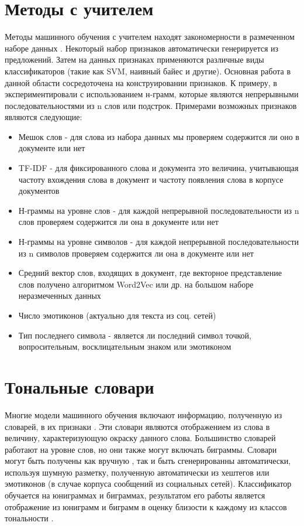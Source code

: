 \section{Методы с учителем}
Методы машинного обучения с учителем находят закономерности в размеченном наборе данных \cite{Pang25}. Некоторый набор признаков автоматически генерируется из предложений. Затем на данных признаках применяются различные виды классификаторов (такие как SVM, наивный байес и другие). Основная работа в данной области сосредоточена на конструировании признаков. К примеру, в \cite{Pang24} экспериментировали с использованием н-грамм, которые являются непрерывными последовательностями из n слов или подстрок. Примерами возможных признаков являются следующие:
\begin{itemize}
    \item Мешок слов - для слова из набора данных мы проверяем содержится ли оно в документе или нет
    \item TF-IDF - для фиксированного слова и документа это величина, учитывающая частоту вхождения слова в документ и частоту появления слова в корпусе документов
    \item Н-граммы на уровне слов - для каждой непрерывной последовательности из n слов проверяем содержится ли она в документе или нет
    \item Н-граммы на уровне символов - для каждой непрерывной последовательности из n символов проверяем содержится ли она в документе или нет
    \item Средний вектор слов, входящих в документ, где векторное представление слов получено алгоритмом Word2Vec или др. на большом наборе неразмеченных данных
    \item Число эмотиконов (актуально для текста из соц. сетей)
    \item Тип последнего символа - является ли последний символ точкой, вопросительным, восклицательным знаком или эмотиконом
\end{itemize}

\section{Тональные словари}
Многие модели машинного обучения включают информацию, полученную из словарей, в их признаки \cite{Jaggi, Mohammad20}. Эти словари являются отображением из слова в величину, характеризующую окраску данного слова. Большинство словарей работают на уровне слов, но они также могут включать биграммы. Словари могут быть получены как вручную \cite{Liu, Mohammad20, Wilson}, так и быть сгенерированны автоматически, используя шумную разметку, полученную автоматически из хештегов или эмотиконов (в случае корпуса сообщений из социальных сетей). Классификатор обучается на юниграммах и биграммах, результатом его работы является отображение из юниграмм и биграмм в оценку близости к каждому из классов тональности \cite{Jaggi, Mohammad19, Severyn30}.

